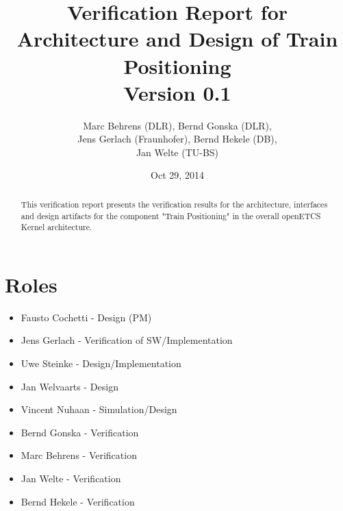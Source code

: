 \documentclass{article}
\title{Verification Report for Architecture and Design of Train Positioning \\Version 0.1}
\author{Marc Behrens (DLR), Bernd Gonska (DLR),\\ Jens Gerlach (Fraunhofer), Bernd Hekele (DB),\\ Jan Welte (TU-BS)}
\date{Oct 29, 2014}
\begin{document}
\maketitle

\begin{abstract}

This verification report presents the verification results for the architecture, interfaces and design artifacts for the component "Train Positioning" in the overall openETCS Kernel architecture.

\begin{comment}
This template provides the required content to complete the verification of architecture and design artifacts.
To close the development phase for this artifact all required information shall be given, even if it can only be stated that specific aspects are missing in the artifact due to open points in related artifacts. 

The template should be used as a guideline to check whether all
information is given appropriately. The wording used in this proposal
is by no means mandatory. And if you feel that more information is
useful to describe your activity within the context of openETCS, you
should of course do so. Feel free to add additional categories of
description as adequate. 

Also the \LaTeX{} macros may be changed, though the use of
\texttt{paragraph} and \texttt{subparagraph} enables easy integration
into higher-level documents (they are not numbered automatically,
which may be a drawback in other respects). 
\end{comment}
\end{abstract}

\section{Roles}

\begin{itemize}
\item Fausto Cochetti - Design (PM)
\item Jens Gerlach - Verification of SW/Implementation
\item Uwe Steinke - Design/Implementation
\item Jan Welvaarts - Design
\item Vincent Nuhaan - Simulation/Design
\item Bernd Gonska - Verification
\item Marc Behrens - Verification
\item Jan Welte - Verification
\item Bernd Hekele - Verification
\end{itemize}
\end{document}
